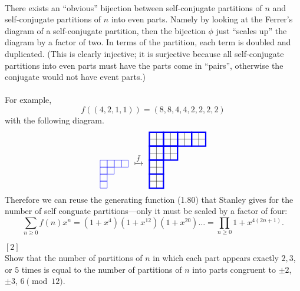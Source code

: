 \documentclass{article}
\newenvironment{problem}[2][Problem]{\begin{trivlist}
\item[\hskip \labelsep {\bfseries #1}\hskip \labelsep {\bfseries #2.}]}{\end{trivlist}}
\newenvironment{solution}[1][Solution.]{\begin{trivlist}
\item[\hskip \labelsep {\bfseries #1}]}{\end{trivlist}}
\begin{document}
\begin{solution} \text{} \\
  There exists an ``obvious'' bijection between self-conjugate partitions of $n$
  and self-conjugate partitions of $n$ into even parts. Namely by looking at
  the Ferrer's diagram of a self-conjugate partition, then the bijection $\phi$
  just ``scales up'' the diagram by a factor of two.
  In terms of the partition, each term is doubled and duplicated.
  (This is clearly injective; it is surjective because all self-conjugate
  partitions into even parts must have the parts come in ``pairs'', otherwise
  the conjugate would not have event parts.)
  \\~\\
  For example, \[
    f((4, 2, 1, 1)) = (8, 8, 4, 4, 2, 2, 2, 2)
  \] with the following diagram.
  \[
    \begin{tikzpicture}[scale=0.3]
      \foreach \x/\y in {
        0/3, 1/3, 2/3, 3/3,
        0/2, 1/2,
        0/1,
        0/0
        } {
        \draw[blue] (\x,\y) rectangle (\x + 1, \y + 1);
        \draw (2*\x + 7, 2*\y) grid (2*\x + 9, 2*\y + 2);
        \draw[ultra thick, blue] (2*\x + 7, 2*\y) rectangle (2*\x + 9, 2*\y + 2);
      }
      \node at (5.5, 4) {$\xmapsto{\bar f}$};
    \end{tikzpicture}
  \]
  Therefore we can reuse the generating function (1.80) that Stanley gives for the
  number of self conguate partitions---only it must be scaled by a factor of
  four: \[
    \sum_{n \geq 0} f(n) x^n
    = (1 + x^4)(1 + x^{12})(1 + x^{20})\hdots
    = \prod_{n \geq 0} 1 + x^{4(2n + 1)}.
  \]
\end{solution}
\pagebreak
\begin{problem}{84} $[2]$ \\
  Show that the number of partitions of $n$ in which each part appears exactly
  $2, 3$, or $5$ times is equal to the number of partitions of $n$ into parts
  congruent to $\pm2$, $\pm3$, $6 \pmod{12}$.
\end{problem}
\end{document}
